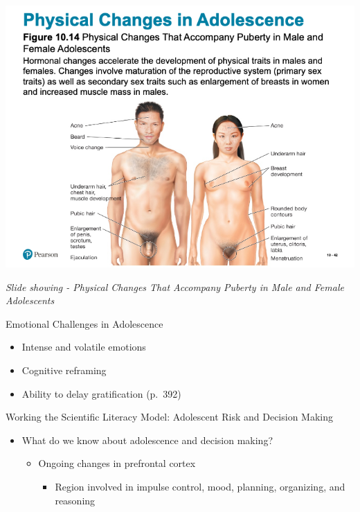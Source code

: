 \documentclass[
]{book}
\providecommand{\tightlist}{%
  \setlength{\itemsep}{0pt}\setlength{\parskip}{0pt}}
\begin{document}
\begin{reflect}
\includegraphics{assets/unit_3/slide_42.png}

\emph{Slide showing - Physical Changes That Accompany Puberty in Male and Female Adolescents}

Emotional Challenges in Adolescence

\begin{itemize}
\tightlist
\item
  Intense and volatile emotions\\
\item
  Cognitive reframing\\
\item
  Ability to delay gratification (p.~392)
\end{itemize}

Working the Scientific Literacy Model: Adolescent Risk and Decision Making

\begin{itemize}
\tightlist
\item
  What do we know about adolescence and decision making?

  \begin{itemize}
  \tightlist
  \item
    Ongoing changes in prefrontal cortex

    \begin{itemize}
    \tightlist
    \item
      Region involved in impulse control, mood, planning, organizing, and reasoning
    \end{itemize}
  \end{itemize}
\end{itemize}


\end{reflect}
\end{document}
